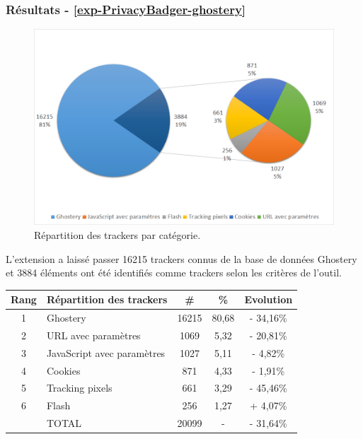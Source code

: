 \subsubsection{Résultats - \autoref{exp-PrivacyBadger-ghostery}}
\begin{figure}[!h]
	\centering
	\includegraphics[scale=.6]{resultats/ANALYSES/Images/PrivacyBadger-Ghostery.png}
	\caption{\label{exp-PrivacyBadger-ghostery}Répartition des trackers par catégorie.}
\end{figure}

L'extension a laissé passer 16215 trackers connus de la base de données Ghostery et 3884 éléments ont été identifiés comme trackers selon les critères de l'outil.\\

\begin{tabular}{ c | p{5cm} | c | c || c | }
   Rang & Répartition des trackers & \# & \% & Evolution \\
   \hline
   \hline
   1 & Ghostery & 16215 & 80,68 & - 34,16\% \\
   2 & URL avec paramètres & 1069 & 5,32 & - 20,81\% \\
   3 & JavaScript avec paramètres & 1027 & 5,11 & - 4,82\% \\
   4 & Cookies & 871 & 4,33 & - 1,91\% \\
   5 & Tracking pixels & 661 & 3,29 & - 45,46\% \\
   6 & Flash & 256 & 1,27 & + 4,07\% \\
   \hline
    & TOTAL & 20099 & - & - 31,64\%\\
   \hline
\end{tabular}
\\[1cm]

